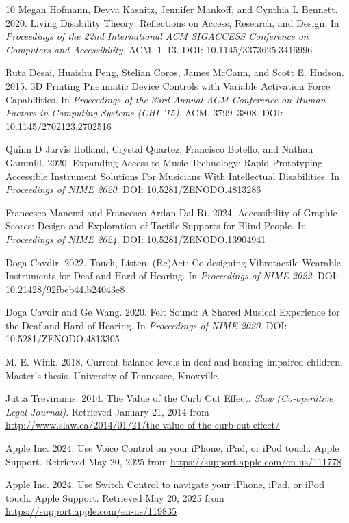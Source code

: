 \documentclass[manuscript,screen,review,anonymous]{acmart}
\begin{document}
\begin{thebibliography}{10}
Megan Hofmann, Devva Kasnitz, Jennifer Mankoff, and Cynthia L Bennett. 2020.
Living Disability Theory: Reflections on Access, Research, and Design.
In \textit{Proceedings of the 22nd International ACM SIGACCESS Conference on Computers and Accessibility}.
ACM, 1--13.
DOI: 10.1145/3373625.3416996

Ruta Desai, Huaishu Peng, Stelian Coros, James McCann, and Scott E. Hudson. 2015.
3D Printing Pneumatic Device Controls with Variable Activation Force Capabilities.
In \textit{Proceedings of the 33rd Annual ACM Conference on Human Factors in Computing Systems (CHI '15)}.
ACM, 3799--3808.
DOI: 10.1145/2702123.2702516

Quinn D Jarvis Holland, Crystal Quartez, Francisco Botello, and Nathan Gammill. 2020.
Expanding Access to Music Technology: Rapid Prototyping Accessible Instrument Solutions For Musicians With Intellectual Disabilities.
In \textit{Proceedings of NIME 2020}.
DOI: 10.5281/ZENODO.4813286

Francesco Manenti and Francesco Ardan Dal Rì. 2024.
Accessibility of Graphic Scores: Design and Exploration of Tactile Supports for Blind People.
In \textit{Proceedings of NIME 2024}.
DOI: 10.5281/ZENODO.13904941

Doga Cavdir. 2022.
Touch, Listen, (Re)Act: Co-designing Vibrotactile Wearable Instruments for Deaf and Hard of Hearing.
In \textit{Proceedings of NIME 2022}.
DOI: 10.21428/92fbeb44.b24043e8

Doga Cavdir and Ge Wang. 2020.
Felt Sound: A Shared Musical Experience for the Deaf and Hard of Hearing.
In \textit{Proceedings of NIME 2020}.
DOI: 10.5281/ZENODO.4813305

M. E. Wink. 2018.
Current balance levels in deaf and hearing impaired children.
Master's thesis. University of Tennessee, Knoxville.

Jutta Treviranus. 2014.
The Value of the Curb Cut Effect.
\textit{Slaw (Co-operative Legal Journal)}.
Retrieved January 21, 2014 from \url{http://www.slaw.ca/2014/01/21/the-value-of-the-curb-cut-effect/}

Apple Inc. 2024.
Use Voice Control on your iPhone, iPad, or iPod touch.
Apple Support.
Retrieved May 20, 2025 from \url{https://support.apple.com/en-us/111778}

Apple Inc. 2024.
Use Switch Control to navigate your iPhone, iPad, or iPod touch.
Apple Support.
Retrieved May 20, 2025 from \url{https://support.apple.com/en-us/119835}


\end{thebibliography}
\end{document}
